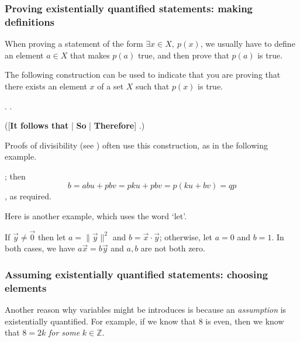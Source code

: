 \subsubsection*{Proving existentially quantified statements: making definitions}

When proving a statement of the form $\exists x \in X,~ p(x)$, we usually have to define an element $a \in X$ that makes $p(a)$ true, and then prove that $p(a)$ is true.

\begin{vocabulary}
\label{vcbDefiningVariable}
The following construction can be used to indicate that you are proving that there exists an element $x$ of a set $X$ such that $p(x)$ is true.

\begin{vocabtemplate}
 . .

([\textbf{It follows that} | \textbf{So} | \textbf{Therefore}] .)
\end{vocabtemplate}
\end{vocabulary}

Proofs of divisibility (see ) often use this construction, as in the following example.

\begin{extract}
\label{xtrProvingExistsExample}
; then
\[ b = abu+pbv = pku+pbv = p(ku+bv) = qp \]
, as required.
\end{extract}

Here is another example, which uses the word `let'.

\begin{extract}
\label{xtrProvingExistsExampleTwo}
If $\vec y \ne \vec 0$ then let $a=\lVert \vec y \rVert^2$ and $b=\vec x \cdot \vec y$; otherwise, let $a=0$ and $b=1$. In both cases, we have $a \vec x = b \vec y$ and $a,b$ are not both zero.
\end{extract}

\subsubsection*{Assuming existentially quantified statements: choosing elements}

Another reason why variables might be introduces is because an \textit{assumption} is existentially quantified. For example, if we know that $8$ is even, then we know that $8 = 2k$ \textit{for some} $k \in \mathbb{Z}$.

